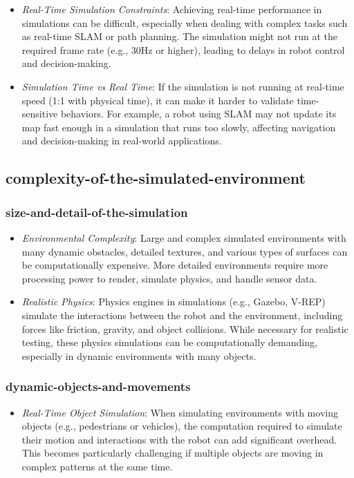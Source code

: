 \documentclass[../../main]{subfiles}
\begin{document}
    \begin{itemize}
    \item
      \emph{Real-Time Simulation Constraints}: Achieving real-time
      performance in simulations can be difficult, especially when dealing
      with complex tasks such as real-time SLAM or path planning. The
      simulation might not run at the required frame rate (e.g., 30Hz or
      higher), leading to delays in robot control and decision-making.
    \item
      \emph{Simulation Time vs Real Time}: If the simulation is not
      running at real-time speed (1:1 with physical time), it can make it
      harder to validate time-sensitive behaviors. For example, a robot
      using SLAM may not update its map fast enough in a simulation that
      runs too slowly, affecting navigation and decision-making in
      real-world applications.
    \end{itemize}
    
    \subsection{complexity-of-the-simulated-environment}

    \subsubsection{size-and-detail-of-the-simulation}    
    \begin{itemize}
    \item
      \emph{Environmental Complexity}: Large and complex simulated
      environments with many dynamic obstacles, detailed textures, and
      various types of surfaces can be computationally expensive. More
      detailed environments require more processing power to render,
      simulate physics, and handle sensor data.
    \item
      \emph{Realistic Physics}: Physics engines in simulations (e.g.,
      Gazebo, V-REP) simulate the interactions between the robot and the
      environment, including forces like friction, gravity, and object
      collisions. While necessary for realistic testing, these physics
      simulations can be computationally demanding, especially in dynamic
      environments with many objects.
    \end{itemize}
    
    \subsubsection{dynamic-objects-and-movements}    
    \begin{itemize}
    \item
      \emph{Real-Time Object Simulation}: When simulating environments
      with moving objects (e.g., pedestrians or vehicles), the computation
      required to simulate their motion and interactions with the robot can
      add significant overhead. This becomes particularly challenging if
      multiple objects are moving in complex patterns at the same time.
    \end{itemize}
    
\end{document}
